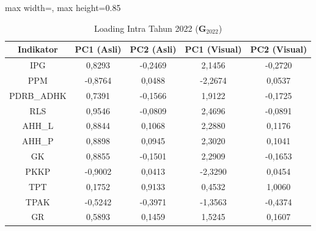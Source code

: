 \begin{table}[H]
\centering
\caption{Loading Intra Tahun 2022 ($\mathbf{G}_{2022}$)} \label{tab:app1loading_intra_2022}
\begin{adjustbox}{max width=\textwidth, max height=0.85\textheight}
\begin{tabular}{|c|c|c|c|c|}
\hline
\textbf{Indikator} & \textbf{PC1 (Asli)} & \textbf{PC2 (Asli)} & \textbf{PC1 (Visual)} & \textbf{PC2 (Visual)} \\
\hline
IPG & 0,8293 & -0,2469 & 2,1456 & -0,2720 \\
PPM & -0,8764 & 0,0488 & -2,2674 & 0,0537 \\
PDRB\_ADHK & 0,7391 & -0,1566 & 1,9122 & -0,1725 \\
RLS & 0,9546 & -0,0809 & 2,4696 & -0,0891 \\
AHH\_L & 0,8844 & 0,1068 & 2,2880 & 0,1176 \\
AHH\_P & 0,8898 & 0,0945 & 2,3020 & 0,1041 \\
GK & 0,8855 & -0,1501 & 2,2909 & -0,1653 \\
PKKP & -0,9002 & 0,0413 & -2,3290 & 0,0454 \\
TPT & 0,1752 & 0,9133 & 0,4532 & 1,0060 \\
TPAK & -0,5242 & -0,3971 & -1,3563 & -0,4374 \\
GR & 0,5893 & 0,1459 & 1,5245 & 0,1607 \\
\hline
\end{tabular}
\end{adjustbox}
\end{table}